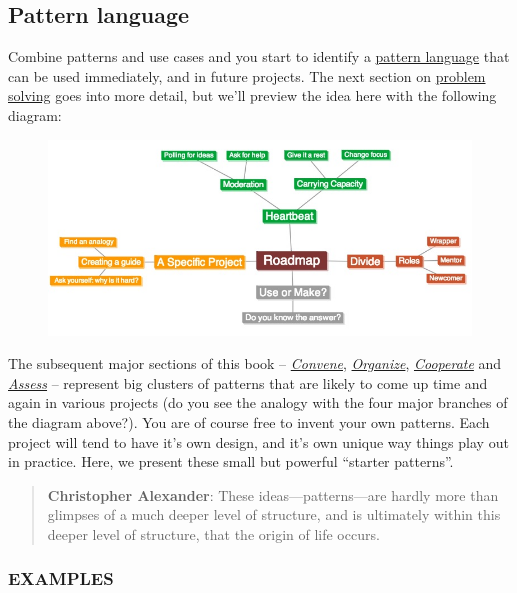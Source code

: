 \subsection{Pattern language}

Combine patterns and use cases and you start to identify a
\href{http://peeragogy.org/practice/heuristics/pattern-language/}{pattern
language} that can be used immediately, and in future projects. The next
section on \href{http://peeragogy.org/practice/heuristics/}{problem
solving} goes into more detail, but we'll preview the idea here with the
following diagram:

\begin{figure}[htbp]
\centering
\includegraphics[width=\textwidth]{../pictures/pattern-map1.jpg}
\end{figure}

The subsequent major sections of this book --
\href{http://peeragogy.org/convene/}{\emph{Convene}},
\href{http://peeragogy.org/organize/}{\emph{Organize}},
\href{http://peeragogy.org/facilitate/}{\emph{Cooperate}} and
\href{http://peeragogy.org/assessment/}{\emph{Assess}} -- represent big
clusters of patterns that are likely to come up time and again in
various projects (do you see the analogy with the four major branches of
the diagram above?). You are of course free to invent your own patterns.
Each project will tend to have it's own design, and it's own unique way
things play out in practice. Here, we present these small but powerful
``starter patterns''.

\begin{quote}
\textbf{Christopher Alexander}: These ideas---patterns---are hardly more
than glimpses of a much deeper level of structure, and is ultimately
within this deeper level of structure, that the origin of life occurs.
\end{quote}
\subsubsection{\textbf{EXAMPLES}}

